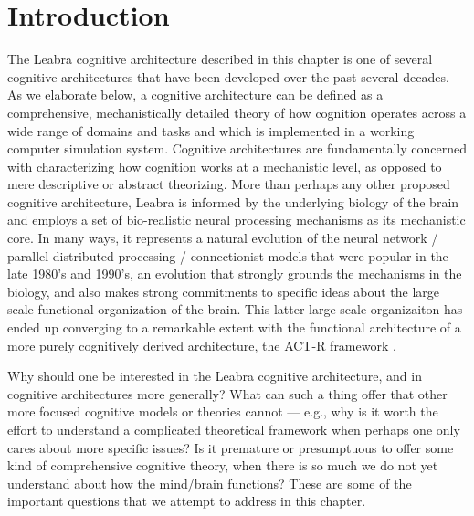 \documentclass[11pt,twoside]{article}
\begin{document}
\titlesamepageoc{\mytitle}{\myauthor}{\mynote}{\myabstract}



\pagestyle{myheadings}

\section{Introduction}

The Leabra cognitive architecture described in this chapter is one of
several cognitive architectures that have been developed over the past
several decades.  As we elaborate below, a cognitive architecture can
be defined as a comprehensive, mechanistically detailed theory of how
cognition operates across a wide range of domains and tasks and which
is implemented in a working computer simulation system.  Cognitive
architectures are fundamentally concerned with characterizing how
cognition works at a mechanistic level, as opposed to mere descriptive
or abstract theorizing.  More than perhaps any other proposed
cognitive architecture, Leabra is informed by the underlying biology
of the brain and employs a set of bio-realistic neural processing
mechanisms as its mechanistic core.  In many ways, it represents a
natural evolution of the neural network / parallel distributed
processing / connectionist models that were popular in the late 1980's
and 1990's, an evolution that strongly grounds the mechanisms in the
biology, and also makes strong commitments to specific ideas about the
large scale functional organization of the brain. This latter large
scale organizaiton has ended up converging to a remarkable extent with
the functional architecture of a more purely cognitively derived
architecture, the ACT-R framework
\cite{Anderson83,Anderson90,Anderson93,AndersonBothellByrneEtAl04}.

Why should one be interested in the Leabra cognitive architecture, and
in cognitive architectures more generally?  What can such a thing
offer that other more focused cognitive models or theories cannot ---
e.g., why is it worth the effort to understand a complicated
theoretical framework when perhaps one only cares about more specific
issues?  Is it premature or presumptuous to offer some kind of
comprehensive cognitive theory, when there is so much we do not yet
understand about how the mind/brain
functions?  These are some of the important questions that we attempt
to address in this chapter.
\end{document}
